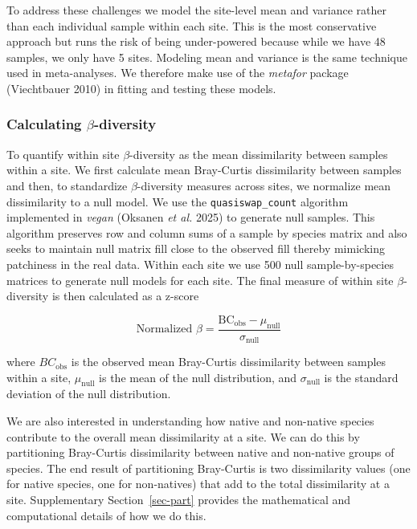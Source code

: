 \documentclass[
  letterpaper,
  DIV=11,
  numbers=noendperiod]{scrartcl}
\newcommand{\ssec}[1]{Supplementary Section~\ref{#1}}
\begin{document}
To address these challenges we model the site-level mean and variance
rather than each individual sample within each site. This is the most
conservative approach but runs the risk of being under-powered because
while we have 48 samples, we only have 5 sites. Modeling mean and
variance is the same technique used in meta-analyses. We therefore make
use of the \emph{metafor} package (Viechtbauer 2010) in fitting and
testing these models.

\subsubsection{\texorpdfstring{Calculating
\(\beta\)-diversity}{Calculating \textbackslash beta-diversity}}\label{calculating-beta-diversity}

To quantify within site \(\beta\)-diversity as the mean dissimilarity
between samples within a site. We first calculate mean Bray-Curtis
dissimilarity between samples and then, to standardize
\(\beta\)-diversity measures across sites, we normalize mean
dissimilarity to a null model. We use the \texttt{quasiswap\_count}
algorithm implemented in \emph{vegan} (Oksanen \emph{et al.} 2025) to
generate null samples. This algorithm preserves row and column sums of a
sample by species matrix and also seeks to maintain null matrix fill
close to the observed fill thereby mimicking patchiness in the real
data. Within each site we use 500 null sample-by-species matrices to
generate null models for each site. The final measure of within site
\(\beta\)-diversity is then calculated as a z-score

\[
\text{Normalized }\beta = \frac{\text{BC}_\text{obs} - \mu_\text{null}}{\sigma_\text{null}}
\]

where \(BC_\text{obs}\) is the observed mean Bray-Curtis dissimilarity
between samples within a site, \(\mu_\text{null}\) is the mean of the
null distribution, and \(\sigma_\text{null}\) is the standard deviation
of the null distribution.

We are also interested in understanding how native and non-native
species contribute to the overall mean dissimilarity at a site. We can
do this by partitioning Bray-Curtis dissimilarity between native and
non-native groups of species. The end result of partitioning Bray-Curtis
is two dissimilarity values (one for native species, one for
non-natives) that add to the total dissimilarity at a site.
\ssec{sec-part} provides the mathematical and computational details of
how we do this.
\end{document}
